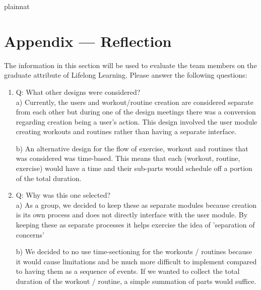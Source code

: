 \documentclass[12pt, titlepage]{article}
\begin{document}

 {plainnat}


\newpage{}
\section*{Appendix --- Reflection}

The information in this section will be used to evaluate the team members on the
graduate attribute of Lifelong Learning.  Please answer the following questions:

\begin{enumerate}
  \item Q: What other designs were considered? \\
  a) Currently, the users and workout/routine creation are considered separate from each other but during one of the design meetings there was a conversion regarding creation being a user's action. This design involved the user module creating workouts and routines rather than having a separate interface.
  
  b) An alternative design for the flow of exercise, workout and routines that was considered was time-based. This means that each (workout, routine, exercise) would have a time and their sub-parts would schedule off a portion of the total duration.
  \item Q: Why was this one selected? \\ 
  a) As a group, we decided to keep these as separate modules because creation is its own process and does not directly interface with the user module. By keeping these as separate processes it helps exercise the idea of 'separation of concerns'
  
  b) We decided to no use time-sectioning for the workouts / routines because it would cause limitations and be much more difficult to implement compared to having them as a sequence of events. If we wanted to collect the total duration of the workout / routine, a simple summation of parts would suffice.
\end{enumerate}
\end{document}
